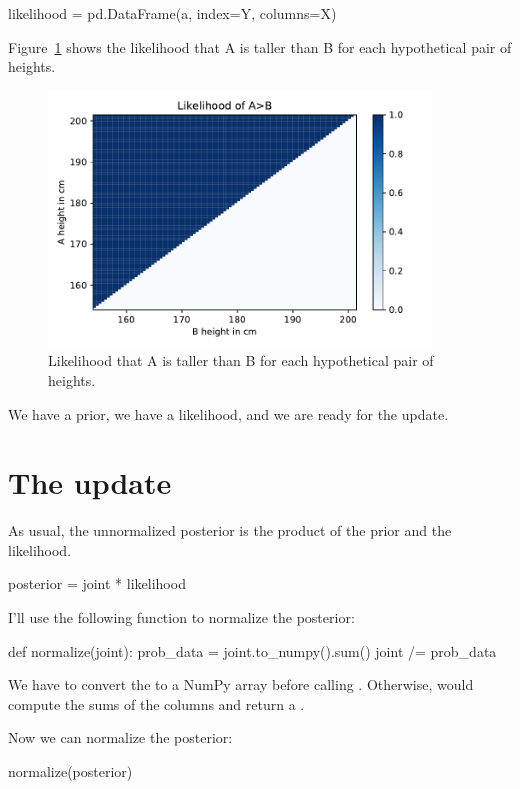 \documentclass[12pt]{book}
\theoremstyle{exercise}
\begin{document}
\begin{code}
likelihood = pd.DataFrame(a, index=Y, columns=X)
\end{code}

Figure~\ref{fig09-02} shows the likelihood that A is taller than B for each hypothetical pair of heights.

\begin{figure}
\centerline{\includegraphics[width=4in]{figs/fig09-02.pdf}}
\caption{Likelihood that A is taller than B for each hypothetical pair of heights.}
\label{fig09-02}
\end{figure}

We have a prior, we have a likelihood, and we are ready for the update.

\section{The update}

As usual, the unnormalized posterior is the product of the prior and the likelihood.

\begin{code}
posterior = joint * likelihood
\end{code}

I'll use the following function to normalize the posterior:

\begin{code}
def normalize(joint):
    prob_data = joint.to_numpy().sum()
    joint /= prob_data
\end{code}

We have to convert the  to a NumPy array before calling .  Otherwise,  would compute the sums of the columns and return a .

Now we can normalize the posterior:

\begin{code}
normalize(posterior)
\end{code}
\end{document}
